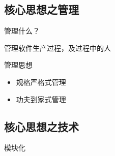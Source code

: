 \documentclass[CJK]{beamer}
\begin{document}
\subsection{核心思想之管理}

\begin{frame}{}
  \begin{block}{管理什么？}
    \begin{center}
      \LARGE 管理软件生产过程，及过程中的人
    \end{center}
  \end{block}
  \pause
  \begin{block}{管理思想}
    \begin{itemize}
      \item \alert{规格严格}式管理 \structure{[工厂式开发]}
      \pause
      \item \alert{功夫到家}式管理 \structure{[敏捷式开发]}
    \end{itemize}
  \end{block}
\end{frame}

\subsection{核心思想之技术}

\begin{frame}{模块化}
\end{frame}
\end{document}
